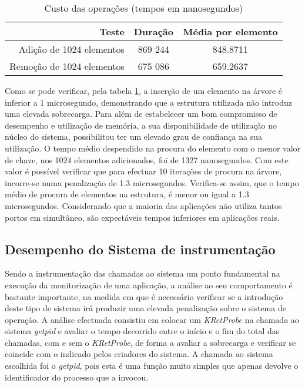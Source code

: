 \begin{table}[!htb]
\begin{center}
\caption{Custo das operações (tempos em nanosegundos)}
\begin{tabular}{ | r | c | c | }
\hline
\hspace{1cm} Teste \hspace{1.5cm} & \hspace{1cm}Duração\hspace{1cm} &  Média por
elemento \\
\hline
Adição de 1024 elementos & 869 244 & 848.8711 \\
\hline
Remoção de 1024 elementos & 675 086 & 659.2637\\
\hline

\hline
\end{tabular}
\label{tab:tree_info}
\end{center}
\end{table}

Como se pode verificar, pela tabela \ref{tab:tree_info}, a inserção de um elemento na árvore é inferior a 1 microsegundo, demonstrando que a estrutura utilizada não introduz uma elevada sobrecarga.
Para além de estabelecer um bom compromisso de desempenho e utilização de memória, a sua disponibilidade de utilização no núcleo do sistema, possibilitou ter um elevado grau de confiança na sua utilização.
O tempo médio despendido na procura do elemento com o menor valor de chave, nos 1024 elementos adicionados, foi de 1327 nanosegundos.
Com este valor é possível verificar que para efectuar 10 iterações de procura na árvore, incorre-se numa penalização de 1.3 microsegundos.
Verifica-se assim, que o tempo médio de procura de elementos na estrutura, é menor ou igual a 1.3 microsegundos.
Considerando que a maioria das aplicações não utiliza tantos portos em simultâneo, são expectáveis tempos inferiores em aplicações reais.


\subsection{Desempenho do Sistema de instrumentação}
Sendo a instrumentação das chamadas ao sistema um ponto fundamental na execução da monitorização de uma aplicação, a análise ao seu comportamento é bastante importante, na medida em que é necessário verificar se a introdução deste tipo de sistema irá produzir uma elevada penalização sobre o sistema de operação.
A análise efectuada consistiu em colocar um \textit{KRetProbe} na chamada ao sistema \textit{getpid} e avaliar o tempo decorrido entre o início e o fim do total das chamadas, com e sem o \textit{KRetProbe}, de forma a avaliar a sobrecarga e verificar se coincide com o indicado pelos criadores do sistema.
A chamada ao sistema escolhida foi o \textit{getpid}, pois esta é uma função muito simples que apenas devolve o identificador do processo que a invocou.

